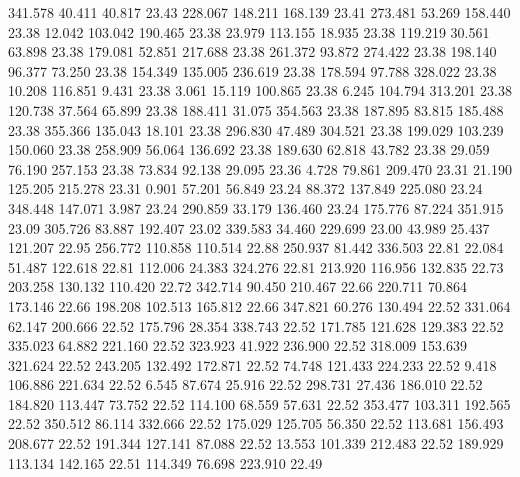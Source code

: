  341.578   40.411   40.817        23.43
 228.067  148.211  168.139        23.41
 273.481   53.269  158.440        23.38
  12.042  103.042  190.465        23.38
  23.979  113.155   18.935        23.38
 119.219   30.561   63.898        23.38
 179.081   52.851  217.688        23.38
 261.372   93.872  274.422        23.38
 198.140   96.377   73.250        23.38
 154.349  135.005  236.619        23.38
 178.594   97.788  328.022        23.38
  10.208  116.851    9.431        23.38
   3.061   15.119  100.865        23.38
   6.245  104.794  313.201        23.38
 120.738   37.564   65.899        23.38
 188.411   31.075  354.563        23.38
 187.895   83.815  185.488        23.38
 355.366  135.043   18.101        23.38
 296.830   47.489  304.521        23.38
 199.029  103.239  150.060        23.38
 258.909   56.064  136.692        23.38
 189.630   62.818   43.782        23.38
  29.059   76.190  257.153        23.38
  73.834   92.138   29.095        23.36
   4.728   79.861  209.470        23.31
  21.190  125.205  215.278        23.31
   0.901   57.201   56.849        23.24
  88.372  137.849  225.080        23.24
 348.448  147.071    3.987        23.24
 290.859   33.179  136.460        23.24
 175.776   87.224  351.915        23.09
 305.726   83.887  192.407        23.02
 339.583   34.460  229.699        23.00
  43.989   25.437  121.207        22.95
 256.772  110.858  110.514        22.88
 250.937   81.442  336.503        22.81
  22.084   51.487  122.618        22.81
 112.006   24.383  324.276        22.81
 213.920  116.956  132.835        22.73
 203.258  130.132  110.420        22.72
 342.714   90.450  210.467        22.66
 220.711   70.864  173.146        22.66
 198.208  102.513  165.812        22.66
 347.821   60.276  130.494        22.52
 331.064   62.147  200.666        22.52
 175.796   28.354  338.743        22.52
 171.785  121.628  129.383        22.52
 335.023   64.882  221.160        22.52
 323.923   41.922  236.900        22.52
 318.009  153.639  321.624        22.52
 243.205  132.492  172.871        22.52
  74.748  121.433  224.233        22.52
   9.418  106.886  221.634        22.52
   6.545   87.674   25.916        22.52
 298.731   27.436  186.010        22.52
 184.820  113.447   73.752        22.52
 114.100   68.559   57.631        22.52
 353.477  103.311  192.565        22.52
 350.512   86.114  332.666        22.52
 175.029  125.705   56.350        22.52
 113.681  156.493  208.677        22.52
 191.344  127.141   87.088        22.52
  13.553  101.339  212.483        22.52
 189.929  113.134  142.165        22.51
 114.349   76.698  223.910        22.49
